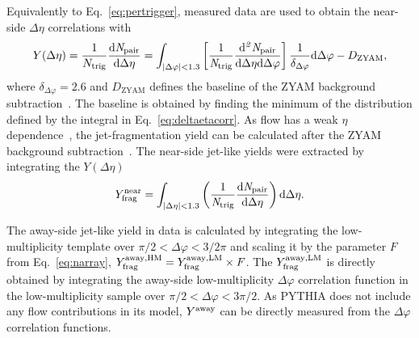 Equivalently to Eq.~\eqref{eq:pertrigger}, measured data are used to obtain the near-side $\Delta\eta$ correlations with
\begin{equation}
Y(\Delta\eta)=\frac{1}{N_{\rm{trig}}} \frac{ \rm{d}\it{}N_{\rm{pair}} }{ \rm{d}\Delta\eta }=\int_{|\Delta\varphi|<1.3}\left[ \frac{1}{\it{N}_{\rm{trig}}} \frac{ \rm{d}\it{}^{2} N_{\rm{pair}} }{ \rm{d}\Delta\eta d\Delta\varphi} \right]\dfrac{1}{\delta_{\Delta\varphi}} {\rm{d}}\Delta \varphi - D_\mathrm{ZYAM},
\label{eq:deltaetacorr}
\end{equation}
where $\delta_{\Delta\varphi}=2.6$ and $D_\mathrm{ZYAM}$ defines the baseline of the ZYAM background subtraction~\cite{Ajitanand:2005jj}. The baseline is obtained by finding the minimum of the distribution defined by the integral in Eq.~\eqref{eq:deltaetacorr}.
As flow has a weak $\eta$ dependence~\cite{ATLAS:2011ah,PHENIX:2018hho,ALICE:2016tlx}, the jet-fragmentation yield can be calculated after the ZYAM background subtraction~\cite{Ajitanand:2005jj}.
The near-side jet-like yields were extracted by integrating the $Y(\Delta\eta)$
\begin{eqnarray}
Y^\mathrm{near}_{\rm{frag}} = \int_{|\Delta \eta|<1.3} \left( \frac{1}{\it{N}_{\rm{trig}}} \frac{ \rm{d}\it{}N_{\rm{pair}} }{ \rm{d}\Delta\eta } \right) \rm{d} \Delta\eta.
\label{eq:Ynear}
\end{eqnarray}

 
The away-side jet-like yield in data is calculated by integrating the low-multiplicity template over $\pi/2<\Delta\varphi<3/2\pi$ and scaling it by the parameter $F$ from Eq.~\eqref{eq:narray}, $Y^{\rm{away, HM}}_{\mathrm{frag}} = Y^{\rm{away, LM}}_{\mathrm{frag}} \times F$. The $Y^{\rm{away, LM}}_{\mathrm{frag}}$ is directly obtained by integrating the away-side low-multiplicity $\Delta\varphi$ correlation function in the low-multiplicity sample over $\pi/2 < \Delta\varphi < 3\pi/2$.
As PYTHIA does not include any flow contributions in its model, $Y^{\rm{away}}$ can be directly measured from the $\Delta\varphi$ correlation functions.


